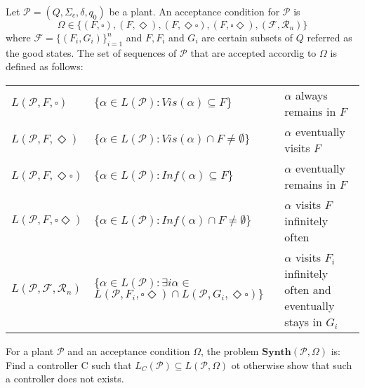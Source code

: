 \documentclass[table]{beamer}
\newcommand{\Plant}{\ensuremath{\mathcal{P}=(Q,\Sigma_c,\delta, q_0)}}
\newcommand{\AccpCond}{\ensuremath{\{(F,\square),(F,\Diamond ),(F,\Diamond\square),(F,\square\Diamond),(\mathcal{F},\mathcal{R}_n)\}}}
\newcommand{\Synth}{\ensuremath{\textbf{Synth}(\mathcal{P},\Omega)}}
\begin{document}
\begin{frame}
	\begin{dfn}
		Let $\Plant$ be a plant. An acceptance condition for $\mathcal{P}$ is
		$$ \Omega \in \AccpCond$$
		where $\mathcal{F} = \{(F_i,G_i)\}^{n}_{i=1}$ and $F, F_i$ and $G_i$ 
		are certain subsets of $Q$ referred as the good states. The set of sequences of $\mathcal{P}$ that are accepted
		accordig to $\Omega$ is defined as follows:
	\end{dfn}
	\begin{adjustwidth}{-1cm}{-1cm}
	\begin{table}[]
		\begin{tabular}{lll}
		\hline
		\rowcolor{azzurro_chiaro}
		$L(\mathcal{P},F,\square)$ & $\{\alpha \in L(\mathcal{P}):Vis(\alpha)\subseteq F\}$ & $\alpha$ always remains in $F$ \\ 
		$L(\mathcal{P},F,\Diamond)$ & $\{\alpha \in L(\mathcal{P}):Vis(\alpha)\cap F \neq \emptyset\}$ & $\alpha$ eventually visits $F$ \\ 
		\rowcolor{azzurro_chiaro}
		$L(\mathcal{P},F,\Diamond\square)$ & $\{\alpha \in L(\mathcal{P}):Inf(\alpha)\subseteq F\}$ & $\alpha$ eventually remains in $F$ \\ 
		$L(\mathcal{P},F,\square\Diamond)$ & $\{\alpha \in L(\mathcal{P}):Inf(\alpha)\cap F \neq \emptyset\}$ & $\alpha$ visits $F$ infinitely often \\ 
		\rowcolor{azzurro_chiaro}
		$L(\mathcal{P},\mathcal{F},\mathcal{R}_n)$ & \shortstack{
			$\{\alpha \in L(\mathcal{P}): \exists i \alpha \in$ \\
			$L(\mathcal{P},F_i,\square\Diamond) \cap L(\mathcal{P},G_i,\Diamond\square)\}$
		} & 
		\shortstack{
			$\alpha$ visits $F_i$ infinitely often \\
			 and eventually stays in $G_i$ }\\ \hline
		\end{tabular}
	\end{table}
	\end{adjustwidth}
\end{frame}

\begin{frame}
	\begin{dfn}
		For a plant $\mathcal{P}$ and an acceptance condition $\Omega$, the problem $\Synth$ is:
		Find a controller C such that $L_C(\mathcal{P})\subseteq L(\mathcal{P},\Omega)$ ot otherwise show that such
		 a controller does not exists.
	\end{dfn}
\end{frame}
\end{document}
